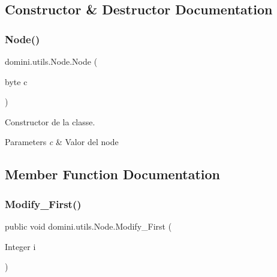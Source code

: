 \subsection{Constructor \& Destructor Documentation}
\mbox{\label{classdomini_1_1utils_1_1Node_ae337ba617322158f0ac240c900350278}} 
\subsubsection{\texorpdfstring{Node()}{Node()}}
{\footnotesize\ttfamily domini.\+utils.\+Node.\+Node (\begin{DoxyParamCaption}\item[{byte}]{c }\end{DoxyParamCaption})\hspace{0.3cm}{\ttfamily [inline]}}



Constructor de la classe. 


\begin{DoxyParams}{Parameters}
{\em c} & Valor del node \\
\hline
\end{DoxyParams}


\subsection{Member Function Documentation}
\mbox{\label{classdomini_1_1utils_1_1Node_a3fe2e958308c90d24607a4e191680089}} 
\subsubsection{\texorpdfstring{Modify\+\_\+\+First()}{Modify\_First()}}
{\footnotesize\ttfamily public void domini.\+utils.\+Node.\+Modify\+\_\+\+First (\begin{DoxyParamCaption}\item[{Integer}]{i }\end{DoxyParamCaption})\hspace{0.3cm}{\ttfamily [inline]}}



